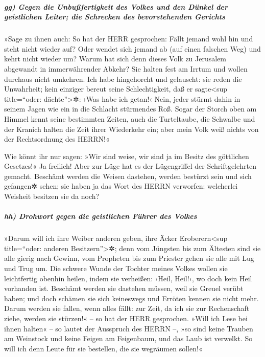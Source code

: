 \hypertarget{gg-gegen-die-unbuuxdffertigkeit-des-volkes-und-den-duxfcnkel-der-geistlichen-leiter-die-schrecken-des-bevorstehenden-gerichts}{%
\subparagraph{gg) Gegen die Unbußfertigkeit des Volkes und den Dünkel
der geistlichen Leiter; die Schrecken des bevorstehenden
Gerichts}\label{gg-gegen-die-unbuuxdffertigkeit-des-volkes-und-den-duxfcnkel-der-geistlichen-leiter-die-schrecken-des-bevorstehenden-gerichts}}

»Sage zu ihnen auch: So hat der HERR gesprochen: Fällt
jemand wohl hin und steht nicht wieder auf? Oder wendet sich jemand ab
(auf einen falschen Weg) und kehrt nicht wieder um? Warum
hat sich denn dieses Volk zu Jerusalem abgewandt in immerwährender
Abkehr? Sie halten fest am Irrtum und wollen durchaus nicht umkehren.
Ich habe hingehorcht und gelauscht: sie reden die
Unwahrheit; kein einziger bereut seine Schlechtigkeit, daß er
sagte\textless sup title=``oder: dächte''\textgreater✲: ›Was habe ich
getan!‹ Nein, jeder stürmt dahin in seinem Jagen wie ein in die Schlacht
stürmendes Roß. Sogar der Storch oben am Himmel kennt
seine bestimmten Zeiten, auch die Turteltaube, die Schwalbe und der
Kranich halten die Zeit ihrer Wiederkehr ein; aber mein Volk weiß nichts
von der Rechtsordnung des HERRN!«

Wie könnt ihr nur sagen: »Wir sind weise, wir sind ja im
Besitz des göttlichen Gesetzes!« Ja freilich! Aber zur Lüge hat es der
Lügengriffel der Schriftgelehrten gemacht. Beschämt werden
die Weisen dastehen, werden bestürzt sein und sich gefangen✲ sehen; sie
haben ja das Wort des HERRN verworfen: welcherlei Weisheit besitzen sie
da noch?

\hypertarget{hh-drohwort-gegen-die-geistlichen-fuxfchrer-des-volkes}{%
\subparagraph{hh) Drohwort gegen die geistlichen Führer des
Volkes}\label{hh-drohwort-gegen-die-geistlichen-fuxfchrer-des-volkes}}

»Darum will ich ihre Weiber anderen geben, ihre Äcker
Eroberern\textless sup title=``oder: anderen Besitzern''\textgreater✲;
denn vom Jüngsten bis zum Ältesten sind sie alle gierig nach Gewinn, vom
Propheten bis zum Priester gehen sie alle mit Lug und Trug um.
Die schwere Wunde der Tochter meines Volkes wollen sie
leichtfertig obenhin heilen, indem sie verheißen: ›Heil, Heil!‹, wo doch
kein Heil vorhanden ist. Beschämt werden sie dastehen
müssen, weil sie Greuel verübt haben; und doch schämen sie sich
keineswegs und Erröten kennen sie nicht mehr. Darum werden sie fallen,
wenn alles fällt: zur Zeit, da ich sie zur Rechenschaft ziehe, werden
sie stürzen!« -- so hat der HERR gesprochen. »Will ich
Lese bei ihnen halten« -- so lautet der Ausspruch des HERRN --, »so sind
keine Trauben am Weinstock und keine Feigen am Feigenbaum, und das Laub
ist verwelkt. So will ich denn Leute für sie bestellen, die sie
wegräumen sollen!«

